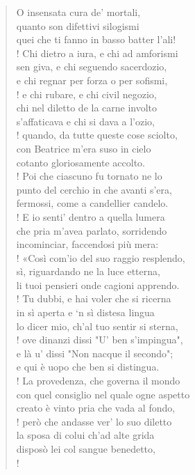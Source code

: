 \documentclass[a4paper, twoside, titlepage]{book}
\begin{document}
\begin{verse}
O insensata cura de’ mortali,\\
quanto son difettivi silogismi\\
quei che ti fanno in basso batter l’ali!\\!
Chi dietro a iura, e chi ad amforismi\\
sen giva, e chi seguendo sacerdozio,\\
e chi regnar per forza o per sofismi,\\!
e chi rubare, e chi civil negozio,\\
chi nel diletto de la carne involto\\
s’affaticava e chi si dava a l’ozio,\\!
quando, da tutte queste cose sciolto,\\
con Beatrice m’era suso in cielo\\
cotanto gloriosamente accolto.\\!
Poi che ciascuno fu tornato ne lo\\
punto del cerchio in che avanti s’era,\\
fermossi, come a candellier candelo.\\!
E io senti’ dentro a quella lumera\\
che pria m’avea parlato, sorridendo\\
incominciar, faccendosi più mera:\\!
«Così com’io del suo raggio resplendo,\\
sì, riguardando ne la luce etterna,\\
li tuoi pensieri onde cagioni apprendo.\\!
Tu dubbi, e hai voler che si ricerna\\
in sì aperta e ‘n sì distesa lingua\\
lo dicer mio, ch’al tuo sentir si sterna,\\!
ove dinanzi dissi "U’ ben s’impingua",\\
e là u’ dissi "Non nacque il secondo";\\
e qui è uopo che ben si distingua.\\!
La provedenza, che governa il mondo\\
con quel consiglio nel quale ogne aspetto\\
creato è vinto pria che vada al fondo,\\!
però che andasse ver’ lo suo diletto\\
la sposa di colui ch’ad alte grida\\
disposò lei col sangue benedetto,\\!

\end{verse}
\end{document}
